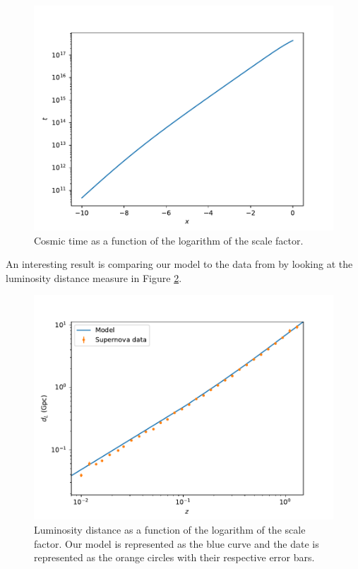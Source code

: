 \documentclass{aa}
\begin{document}
\begin{figure}[ht]
\centering
\includegraphics[width=\hsize]{figures/t.pdf}
  \caption{Cosmic time as a function of the logarithm of the scale factor.}
     \label{fig:t}
\end{figure}

An interesting result is comparing our model to the data from \cite{Betoule_2014} by looking at the luminosity distance measure in Figure \ref{fig:dL}.

\begin{figure}[ht]
\centering
\includegraphics[width=\hsize]{figures/dL.pdf}
  \caption{Luminosity distance as a function of the logarithm of the scale factor. Our model is represented as the blue curve and the date is represented as the orange circles with their respective error bars.}
     \label{fig:dL}
\end{figure}
\end{document}
